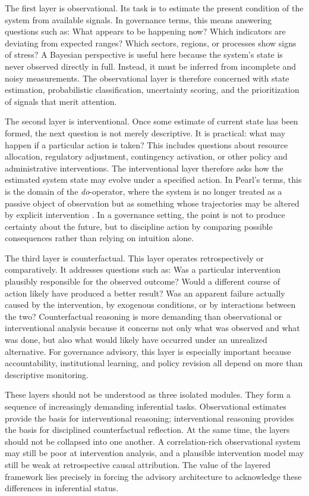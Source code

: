 \documentclass[11pt]{article}
\begin{document}
The first layer is observational. Its task is to estimate the present condition of the system from available signals. In governance terms, this means answering questions such as: What appears to be happening now? Which indicators are deviating from expected ranges? Which sectors, regions, or processes show signs of stress? A Bayesian perspective is useful here because the system's state is never observed directly in full. Instead, it must be inferred from incomplete and noisy measurements. The observational layer is therefore concerned with state estimation, probabilistic classification, uncertainty scoring, and the prioritization of signals that merit attention.

The second layer is interventional. Once some estimate of current state has been formed, the next question is not merely descriptive. It is practical: what may happen if a particular action is taken? This includes questions about resource allocation, regulatory adjustment, contingency activation, or other policy and administrative interventions. The interventional layer therefore asks how the estimated system state may evolve under a specified action. In Pearl's terms, this is the domain of the \emph{do}-operator, where the system is no longer treated as a passive object of observation but as something whose trajectories may be altered by explicit intervention \citep{pearl2000}. In a governance setting, the point is not to produce certainty about the future, but to discipline action by comparing possible consequences rather than relying on intuition alone.

The third layer is counterfactual. This layer operates retrospectively or comparatively. It addresses questions such as: Was a particular intervention plausibly responsible for the observed outcome? Would a different course of action likely have produced a better result? Was an apparent failure actually caused by the intervention, by exogenous conditions, or by interactions between the two? Counterfactual reasoning is more demanding than observational or interventional analysis because it concerns not only what was observed and what was done, but also what would likely have occurred under an unrealized alternative. For governance advisory, this layer is especially important because accountability, institutional learning, and policy revision all depend on more than descriptive monitoring.

These layers should not be understood as three isolated modules. They form a sequence of increasingly demanding inferential tasks. Observational estimates provide the basis for interventional reasoning; interventional reasoning provides the basis for disciplined counterfactual reflection. At the same time, the layers should not be collapsed into one another. A correlation-rich observational system may still be poor at intervention analysis, and a plausible intervention model may still be weak at retrospective causal attribution. The value of the layered framework lies precisely in forcing the advisory architecture to acknowledge these differences in inferential status.
\end{document}
